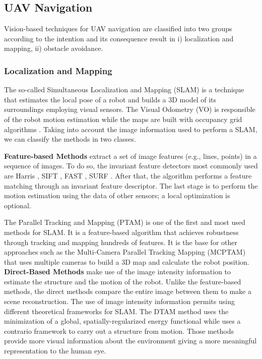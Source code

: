 \subsection{UAV Navigation}
Vision-based techniques for UAV navigation are classified into two groups according to the intention and its consequence result in i) localization and mapping, ii) obstacle avoidance.

\subsubsection{Localization and Mapping}
The so-called Simultaneous Localization and Mapping (SLAM) is a technique that estimates the local pose of a robot and builds a 3D model of its surroundings employing visual sensors. The Visual Odometry (VO) \cite{Scaramuzza.Fraundorfer:RAM:2011} is responsible of the robot motion estimation while the maps are built with occupancy grid algorithms \cite{Thrun.Bu:AI:1996}. Taking into account the image information used to perform a SLAM, we can classify the methods in two classes.

\textbf{Feature-based Methods} extract a set of image features (e.g., lines, points) in a sequence of images. To do so, the invariant feature detectors most commonly used are Harris \cite{Harris.Stephens:AVC:1988}, SIFT \cite{Lowe:ICCV:1999}, FAST \cite{Rosten.Drummond:ECCV:2006}, SURF \cite{Bay.Ess.ea:CVIU:2008}. After that, the algorithm performs a feature matching through an invariant feature descriptor. The last stage is to perform the motion estimation using the data of other sensors; a local optimization is optional. 

The Parallel Tracking and Mapping (PTAM) \cite{Klein.Murray:ISMAR:2007} is one of the first and most used methods for SLAM. It is a feature-based algorithm that achieves robustness through tracking and mapping hundreds of features. It is the base for other approaches such as the Multi-Camera Parallel Tracking Mapping (MCPTAM) \cite{Harmat.Trentini.ea:IROS:2015} that uses multiple cameras to build a 3D map and calculate the robot position. \\

\textbf{Direct-Based Methods} make use of the image intensity information to estimate the structure and the motion of the robot. Unlike the feature-based methods, the direct methods compare the entire image between them to make a scene reconstruction. The use of image intensity information permits using different theoretical frameworks for SLAM. The DTAM method \cite{Newcombe.Lovegrove.ea:ICCV:2011} uses the minimization of a global, spatially-regularized energy functional while \cite{Moulon.Monasse.ea:ACCV:2012} uses a contrario framework to carry out a structure from motion.
Those methods provide more visual information about the environment giving a more meaningful representation to the human eye. 

